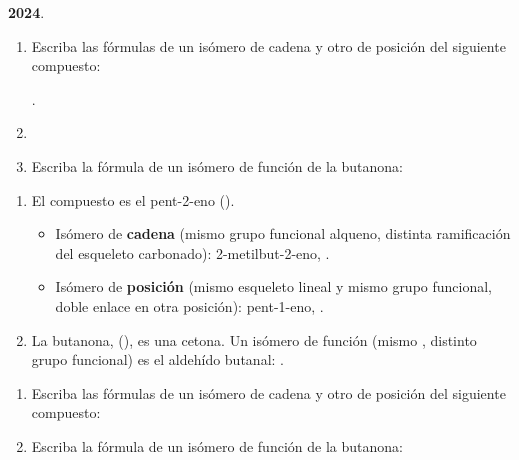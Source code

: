 \begin{exerciseEVAU}
    \textbf{2024}.
    \begin{enumerate}[label=\letraminuscula]
         \item Escriba las fórmulas de un isómero de cadena y otro de posición del siguiente compuesto:

         .

         \item \item Escriba la fórmula de un isómero de función de la butanona: 

    \end{enumerate}

    \begin{solu}
        \begin{enumerate}[label=\letraminuscula]
            \item El compuesto  es el pent-2-eno ().
            \begin{itemize}
                \item Isómero de \textbf{cadena} (mismo grupo funcional alqueno, distinta ramificación del esqueleto carbonado): 2-metilbut-2-eno, .
                \item Isómero de \textbf{posición} (mismo esqueleto lineal y mismo grupo funcional, doble enlace en otra posición): pent-1-eno, .
            \end{itemize}

            \item La butanona,  (), es una cetona. Un isómero de función (mismo , distinto grupo funcional) es el aldehído butanal: .
        \end{enumerate}
    \end{solu}
\end{exerciseEVAU}

\begin{exerciseEVAU}
    \begin{enumerate}[label=\letraminuscula]
        \item Escriba las fórmulas de un isómero de cadena y otro de posición del siguiente compuesto:

        \item Escriba la fórmula de un isómero de función de la butanona:
        
    \end{enumerate}
    \begin{solu}

    \end{solu}
\end{exerciseEVAU}

